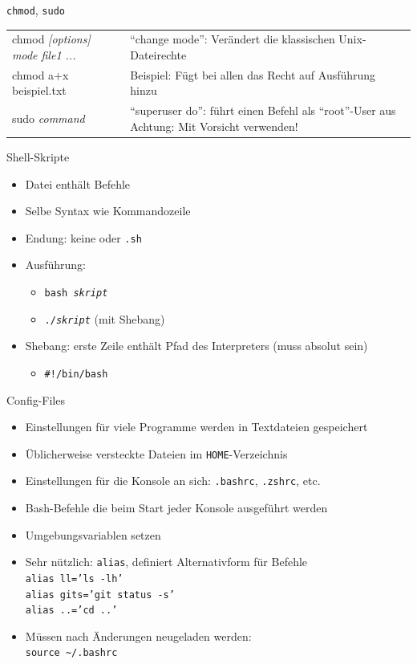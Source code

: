 \begin{frame}{\texttt{chmod}, \texttt{sudo}}
  \begin{tabu}{>{\ttfamily}l X[,L]}
    chmod \textit{[options] mode file1 ...}    & \enquote{change mode}: Verändert die klassischen Unix-Dateirechte  \\
    chmod a+x beispiel.txt    & Beispiel: Fügt bei allen das Recht auf Ausführung hinzu \\
    sudo \textit{command} & \enquote{superuser do}: führt einen Befehl als \enquote{root}-User aus \alert{Achtung}: Mit Vorsicht verwenden!\\
  \end{tabu}
\end{frame}

\begin{frame}{Shell-Skripte}
  \begin{itemize}
    \item Datei enthält Befehle
    \item Selbe Syntax wie Kommandozeile
    \item Endung: keine oder \texttt{.sh}
    \item Ausführung:
      \begin{itemize}
        \item \texttt{bash \textit{skript}}
        \item \texttt{./\textit{skript}} (mit Shebang)
      \end{itemize}
    \item Shebang: erste Zeile enthält Pfad des Interpreters (muss absolut sein)
      \begin{itemize}
        \item \texttt{\#!/bin/bash}
      \end{itemize}
  \end{itemize}
\end{frame}

\begin{frame}{Config-Files}
  \begin{itemize}
    \item Einstellungen für viele Programme werden in Textdateien gespeichert
    \item Üblicherweise versteckte Dateien im \texttt{HOME}-Verzeichnis
    \item Einstellungen für die Konsole an sich: \texttt{.bashrc}, \texttt{.zshrc}, etc.
    \item Bash-Befehle die beim Start jeder Konsole ausgeführt werden
    \item Umgebungsvariablen setzen
    \item Sehr nützlich: \texttt{alias}, definiert Alternativform für Befehle \\
      \texttt{alias ll='ls -lh'} \\
      \texttt{alias gits='git status -s'} \\
      \texttt{alias ..='cd ..'}
    \item Müssen nach Änderungen neugeladen werden:\\
      \texttt{source \textasciitilde/.bashrc}
  \end{itemize}
\end{frame}

